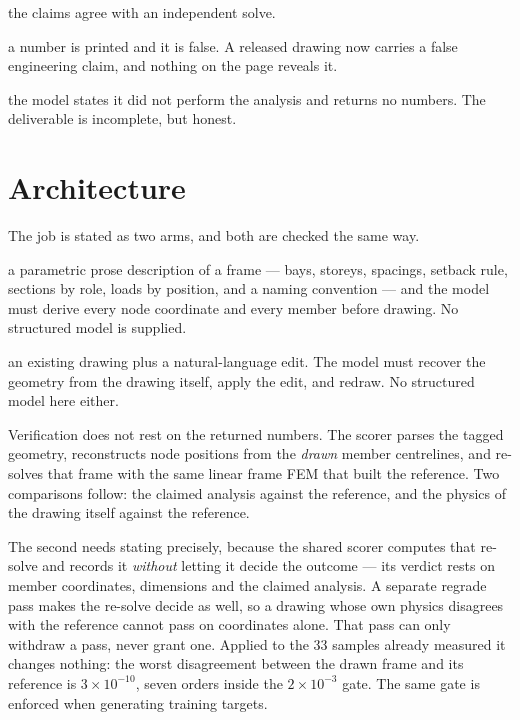 \documentclass[11pt,a4paper]{article}
\begin{document}
\begin{description}[leftmargin=2.4em,style=nextline]
\item[\textcolor{okgreen}{Correct}] the claims agree with an independent solve.
\item[\textcolor{badred}{Wrong}] a number is printed and it is false. A released drawing now carries a
      false engineering claim, and nothing on the page reveals it.
\item[\textcolor{warnamber}{Declined}] the model states it did not perform the analysis and returns no
      numbers. The deliverable is incomplete, but honest.
\end{description}

\section{Architecture}

The job is stated as two arms, and both are checked the same way.

\begin{description}[leftmargin=2.4em,style=nextline]
\item[\textbf{text $\to$ SVG}] a parametric prose description of a frame --- bays, storeys, spacings,
      setback rule, sections by role, loads by position, and a naming convention --- and the model must
      derive every node coordinate and every member before drawing. No structured model is supplied.
\item[\textbf{SVG $\to$ SVG}] an existing drawing plus a natural-language edit. The model must recover
      the geometry from the drawing itself, apply the edit, and redraw. No structured model here either.
\end{description}

Verification does not rest on the returned numbers. The scorer parses the tagged geometry, reconstructs
node positions from the \emph{drawn} member centrelines, and re-solves that frame with the same linear
frame FEM that built the reference. Two comparisons follow: the claimed analysis against the reference,
and the physics of the drawing itself against the reference.

The second needs stating precisely, because the shared scorer computes that re-solve and records it
\emph{without} letting it decide the outcome --- its verdict rests on member coordinates, dimensions and
the claimed analysis. A separate regrade pass makes the re-solve decide as well, so a drawing whose own
physics disagrees with the reference cannot pass on coordinates alone. That pass can only withdraw a
pass, never grant one. Applied to the 33 samples already measured it changes nothing: the worst
disagreement between the drawn frame and its reference is $3\times10^{-10}$, seven orders inside the
$2\times10^{-3}$ gate. The same gate is enforced when generating training targets.
\end{document}
